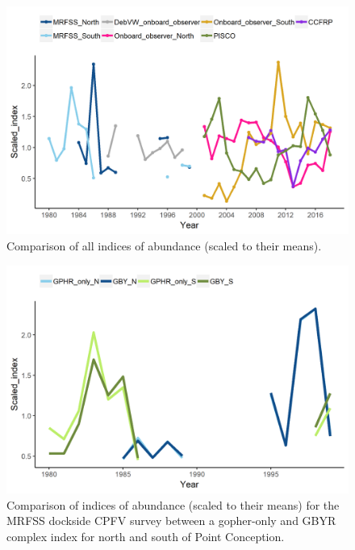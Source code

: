 \documentclass[12pt,]{article}
\begin{document}
\begin{figure}
\centering
\includegraphics{Figures/All_index_compare.png}
\caption{Comparison of all indices of abundance (scaled to their means).
\label{fig:All_index_compare}}
\end{figure}

\begin{figure}
\centering
\includegraphics{Figures/MRFSS_index_compare.png}
\caption{Comparison of indices of abundance (scaled to their means) for
the MRFSS dockside CPFV survey between a gopher-only and GBYR complex
index for north and south of Point Conception.
\label{fig:MRFSS_index_compare}}
\end{figure}
\end{document}
